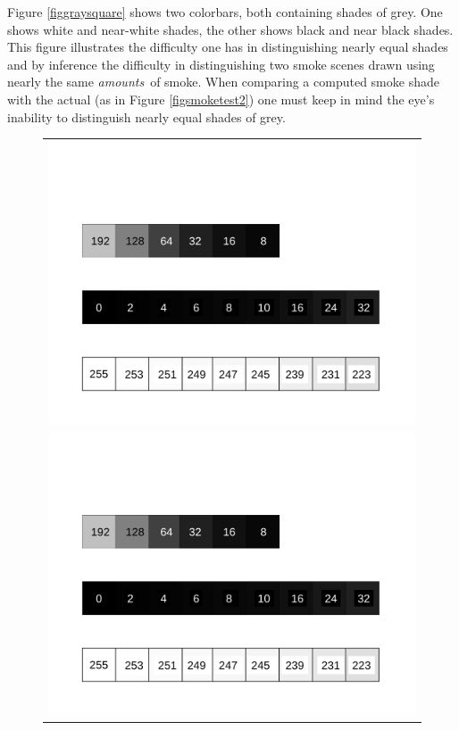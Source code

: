 \documentclass[11pt,twoside]{book}
\begin{document}
Figure \ref{figgraysquare} shows two colorbars, both containing shades of grey.
One shows white and near-white shades, the other shows black and near black shades.
This figure illustrates the difficulty one has in distinguishing nearly equal shades
and by inference the difficulty in distinguishing two smoke scenes drawn using nearly
the same {\em amounts}\ of smoke.  When comparing a computed smoke shade with the actual
(as in Figure \ref{figsmoketest2}) one must keep in mind the eye's inability to
distinguish nearly equal shades of grey.

\begin{figure}[bph]
\begin{center}
 \centering
\begin{tabular}{c}
\includegraphics[width=6.0in]{FIGURES/graysquares_black}\\
\includegraphics[width=6.0in]{FIGURES/graysquares_white}\\

\end{tabular}
\end{center}
\end{figure}
\end{document}
